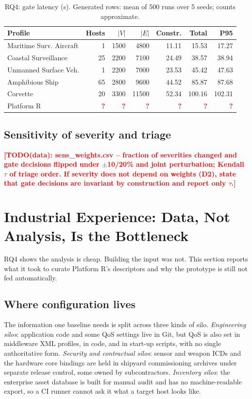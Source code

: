 \documentclass[sigconf,screen]{acmart}
\newcommand{\TODOdata}[1]{\textcolor{red}{\textbf{[TODO(data): #1]}}}
\newcommand{\tbd}{\textcolor{red}{\textbf{?}}}
\begin{document}
\begin{table}[t]
\centering
\caption{RQ4: gate latency (s). Generated rows: mean of 500 runs over 5 seeds; counts approximate.}
\label{tab:latency}
\small
\setlength{\tabcolsep}{2.2pt}
\begin{tabularx}{\columnwidth}{Y r r r r r r}
\toprule
Profile & Hosts & $|V|$ & $|E|$ & Constr. & Total & P95 \\
\midrule
Maritime Surv. Aircraft & 1 & 1500 & 4800 & 11.11 & 15.53 & 17.27 \\
Coastal Surveillance & 25 & 2200 & 7100 & 24.49 & 38.57 & 38.94 \\
Unmanned Surface Veh. & 1 & 2200 & 7000 & 23.53 & 45.42 & 47.63 \\
Amphibious Ship & 65 & 2800 & 9600 & 44.52 & 85.87 & 87.68 \\
Corvette & 20 & 3300 & 11500 & 52.34 & 100.16 & 102.31 \\
\midrule
Platform R & \tbd & \tbd & \tbd & \tbd & \tbd & \tbd \\
\bottomrule
\end{tabularx}
\end{table}

\subsection{Sensitivity of severity and triage}
\TODOdata{sens\_weights.csv -- fraction of severities changed and gate decisions flipped under $\pm$10/20\% and joint perturbation; Kendall $\tau$ of triage order. If severity does not depend on weights (D2), state that gate decisions are invariant by construction and report only $\tau$.}

\section{Industrial Experience: Data, Not Analysis, Is the Bottleneck}

RQ4 shows the analysis is cheap. Building the input was not. This section reports what it took to curate Platform R's descriptors and why the prototype is still not fed automatically.

\subsection{Where configuration lives}
The information one baseline needs is split across three kinds of silo. \emph{Engineering silos}: application code and some QoS settings live in Git, but QoS is also set in middleware XML profiles, in code, and in start-up scripts, with no single authoritative form. \emph{Security and contractual silos}: sensor and weapon ICDs and the hardware core bindings are held in shipyard commissioning archives under separate release control, some owned by subcontractors. \emph{Inventory silos}: the enterprise asset database is built for manual audit and has no machine-readable export, so a CI runner cannot ask it what a target host looks like.
\end{document}
